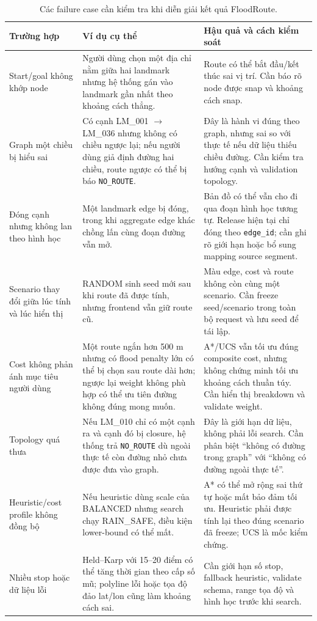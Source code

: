 \begin{table}[H]
\centering
\small
\begin{tabularx}{\textwidth}{@{}p{} X X@{}}
\toprule
\textbf{Trường hợp} & \textbf{Ví dụ cụ thể} & \textbf{Hậu quả và cách kiểm soát}\\
\midrule
Start/goal không khớp node & Người dùng chọn một địa chỉ nằm giữa hai landmark nhưng hệ thống gán vào landmark gần nhất theo khoảng cách thẳng. & Route có thể bắt đầu/kết thúc sai vị trí. Cần báo rõ node được snap và khoảng cách snap.\\
Graph một chiều bị hiểu sai & Có cạnh LM\_001 $\rightarrow$ LM\_036 nhưng không có chiều ngược lại; nếu người dùng giả định đường hai chiều, route ngược có thể bị báo \texttt{NO\_ROUTE}. & Đây là hành vi đúng theo graph, nhưng sai so với thực tế nếu dữ liệu thiếu chiều đường. Cần kiểm tra hướng cạnh và validation topology.\\
Đóng cạnh nhưng không lan theo hình học & Một landmark edge bị đóng, trong khi aggregate edge khác chồng lấn cùng đoạn đường vẫn mở. & Bản đồ có thể vẫn cho đi qua đoạn hình học tương tự. Release hiện tại chỉ đóng theo \texttt{edge\_id}; cần ghi rõ giới hạn hoặc bổ sung mapping source segment.\\
Scenario thay đổi giữa lúc tính và lúc hiển thị & RANDOM sinh seed mới sau khi route đã được tính, nhưng frontend vẫn giữ route cũ. & Màu edge, cost và route không còn cùng một scenario. Cần freeze seed/scenario trong toàn bộ request và lưu seed để tái lập.\\
Cost không phản ánh mục tiêu người dùng & Một route ngắn hơn 500 m nhưng có flood penalty lớn có thể bị chọn sau route dài hơn; ngược lại weight không phù hợp có thể ưu tiên đường không đúng mong muốn. & A*/UCS vẫn tối ưu đúng composite cost, nhưng không chứng minh tối ưu khoảng cách thuần túy. Cần hiển thị breakdown và validate weight.\\
Topology quá thưa & Nếu LM\_010 chỉ có một cạnh ra và cạnh đó bị closure, hệ thống trả \texttt{NO\_ROUTE} dù ngoài thực tế còn đường nhỏ chưa được đưa vào graph. & Đây là giới hạn dữ liệu, không phải lỗi search. Cần phân biệt ``không có đường trong graph'' với ``không có đường ngoài thực tế''.\\
Heuristic/cost profile không đồng bộ & Nếu heuristic dùng scale của BALANCED nhưng search chạy RAIN\_SAFE, điều kiện lower-bound có thể mất. & A* có thể mở rộng sai thứ tự hoặc mất bảo đảm tối ưu. Heuristic phải được tính lại theo đúng scenario đã freeze; UCS là mốc kiểm chứng.\\
Nhiều stop hoặc dữ liệu lỗi & Held--Karp với 15--20 điểm có thể tăng thời gian theo cấp số mũ; polyline lỗi hoặc tọa độ đảo lat/lon cũng làm khoảng cách sai. & Cần giới hạn số stop, fallback heuristic, validate schema, range tọa độ và hình học trước khi search.\\
\bottomrule
\end{tabularx}
\caption{Các failure case cần kiểm tra khi diễn giải kết quả FloodRoute.}
\end{table}

